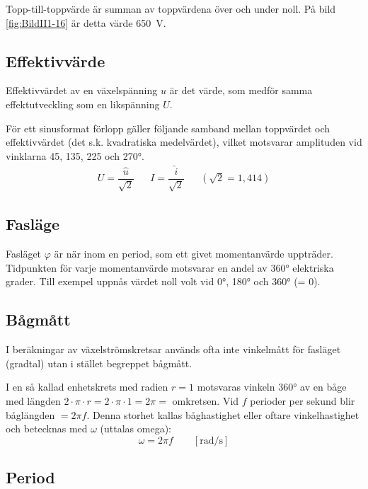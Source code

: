 Topp-till-toppvärde är summan av toppvärdena över och under noll.
På bild \ref{fig:BildII1-16} är detta värde \SI{650}{\volt}.

\subsection{Effektivvärde}

Effektivvärdet av en växelspänning \(u\) är det värde, som medför samma
effektutveckling som en likspänning \(U\).

För ett sinusformat förlopp gäller följande samband mellan toppvärdet och
effektivvärdet (det s.k. kvadratiska medelvärdet), vilket motsvarar amplituden
vid vinklarna 45, 135, 225 och \ang{270}.
\[
\begin{array}{lllll}
U=\dfrac{\hat{u}}{\sqrt{2}} & & I=\dfrac{\hat{i}}{\sqrt{2}} & & (\sqrt{2} = 1,414)
\end{array}
\]
\subsection{Fasläge}

Fasläget \(\varphi\) är när inom en period, som ett givet momentanvärde
uppträder.
Tidpunkten för varje momentanvärde motsvarar en andel av \ang{360} elektriska
grader.
Till exempel uppnås värdet noll volt vid \ang{0}, \ang{180} och \ang{360} (= 0\degree).

\subsection{Bågmått}

I beräkningar av växelströmskretsar används ofta inte vinkelmått för fasläget
(gradtal) utan i stället begreppet bågmått.

I en så kallad enhetskrets med radien \(r = 1\) motsvaras vinkeln \ang{360} av
en båge med längden \(2 \cdot \pi \cdot r= 2 \cdot \pi \cdot 1 = 2 \pi =\)
omkretsen.
Vid \(f\) perioder per sekund blir båglängden \(= 2\pi f\).
Denna storhet kallas båghastighet eller oftare vinkelhastighet och betecknas
med \(\omega\) (uttalas omega):
\[\omega= 2\pi f\qquad [\text{rad/s}]\]
\subsection{Period}

